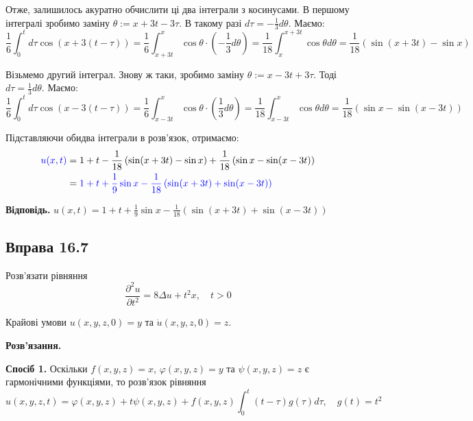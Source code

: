 \documentclass{hw_template}
\begin{document}
Отже, залишилось акуратно обчислити ці два інтеграли з косинусами. В першому інтегралі зробимо заміну 
$\theta := x+3t-3\tau$. В такому разі $d\tau = -\frac{1}{3}d\theta$. Маємо:
\begin{equation*}
    \frac{1}{6}\int_0^t d\tau \cos(x+3(t-\tau)) = \frac{1}{6}\int_{x+3t}^{x} \cos\theta \cdot \left(-\frac{1}{3}d\theta\right)  = \frac{1}{18}\int_x^{x+3t} \cos\theta d\theta = \frac{1}{18} \left( \sin(x+3t) - \sin x \right)
\end{equation*}

Візьмемо другий інтеграл. Знову ж таки, зробимо заміну $\theta := x-3t+3\tau$. Тоді $d\tau = \frac{1}{3}d\theta$. Маємо:
\begin{equation*}
    \frac{1}{6}\int_0^t d\tau \cos(x-3(t-\tau)) = \frac{1}{6}\int_{x-3t}^{x} \cos\theta \cdot \left(\frac{1}{3}d\theta\right)  = \frac{1}{18}\int_{x-3t}^{x} \cos\theta d\theta = \frac{1}{18} \left( \sin x - \sin(x-3t) \right)
\end{equation*}

Підставляючи обидва інтеграли в розв'язок, отримаємо:
\begin{align*}
    \textcolor{blue}{u(x,t)} &= 1 + t - \frac{1}{18} \left( \sin(x+3t) - \sin x \right) + \frac{1}{18} \left( \sin x - \sin(x-3t) \right) \\
    &= \textcolor{blue}{1 + t + \frac{1}{9}\sin x - \frac{1}{18} \left( \sin(x+3t) + \sin(x-3t) \right)}
\end{align*}

\textbf{Відповідь.} $u(x,t) = 1 + t + \frac{1}{9}\sin x - \frac{1}{18} \left( \sin(x+3t) + \sin(x-3t) \right)$

\subsection{Вправа 16.7}

\begin{problem}
    Розв'язати рівняння
    \begin{equation*}
        \frac{\partial^2 u}{\partial t^2} = 8\Delta u + t^2x, \quad t > 0
    \end{equation*}

    Крайові умови $u(x,y,z,0)=y$ та $\dot{u}(x,y,z,0)=z$.
\end{problem}

\textbf{Розв'язання.}

\textbf{Спосіб 1.} Оскільки $f(x,y,z)=x$, $\varphi(x,y,z)=y$ та $\psi(x,y,z)=z$ є 
гармонічними функціями, то розв'язок рівняння
\begin{equation*}
    u(x,y,z,t) = \varphi(x,y,z) + t\psi(x,y,z) + f(x,y,z)\int_0^t (t-\tau)g(\tau)d\tau, \quad g(t) = t^2
\end{equation*}
\end{document}
